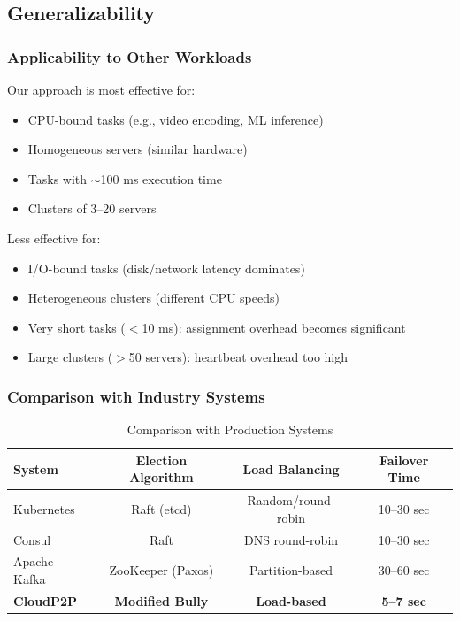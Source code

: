 \documentclass[12pt,a4paper]{article}
\begin{document}
\subsection{Generalizability}

\subsubsection{Applicability to Other Workloads}

Our approach is most effective for:
\begin{itemize}
    \item CPU-bound tasks (e.g., video encoding, ML inference)
    \item Homogeneous servers (similar hardware)
    \item Tasks with $\sim$100 ms execution time
    \item Clusters of 3--20 servers
\end{itemize}

Less effective for:
\begin{itemize}
    \item I/O-bound tasks (disk/network latency dominates)
    \item Heterogeneous clusters (different CPU speeds)
    \item Very short tasks ($<$10 ms): assignment overhead becomes significant
    \item Large clusters ($>$50 servers): heartbeat overhead too high
\end{itemize}

\subsubsection{Comparison with Industry Systems}

\begin{table}[h]
\centering
\caption{Comparison with Production Systems}
\label{tab:industry}
\small
\begin{tabular}{@{}lccc@{}}
\toprule
\textbf{System} & \textbf{Election Algorithm} & \textbf{Load Balancing} & \textbf{Failover Time} \\
\midrule
Kubernetes & Raft (etcd) & Random/round-robin & 10--30 sec \\
Consul & Raft & DNS round-robin & 10--30 sec \\
Apache Kafka & ZooKeeper (Paxos) & Partition-based & 30--60 sec \\
\textbf{CloudP2P} & \textbf{Modified Bully} & \textbf{Load-based} & \textbf{5--7 sec} \\
\bottomrule
\end{tabular}
\end{table}
\end{document}
